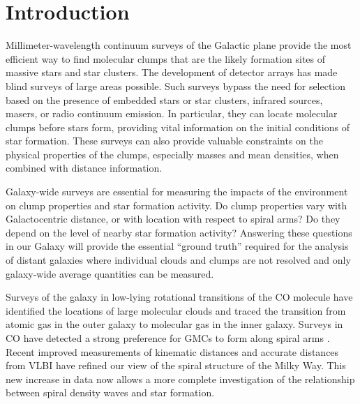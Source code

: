 \documentclass[12pt,preprint]{aastex}
\begin{document}

\section{Introduction}
\label{sec:Introduction}

Millimeter-wavelength continuum surveys of the Galactic plane provide
the most efficient way to find molecular clumps that are the likely
formation sites of massive stars and star clusters. The development of
detector arrays has made blind surveys of large areas possible.  Such
surveys bypass the need for selection based on the presence of
embedded stars or star clusters, infrared sources, masers, or radio
continuum emission. In particular, they can locate molecular clumps
before stars form, providing vital information on the initial
conditions of star formation.  These surveys can also provide valuable
constraints on the physical properties of the clumps, especially
masses and mean densities, when combined with distance information.

Galaxy-wide surveys are essential for measuring the impacts of the
environment on clump properties and star formation activity.  Do clump
properties vary with Galactocentric distance, or with location with
respect to spiral arms?  Do they depend on the level of nearby star
formation activity?  Answering these questions in our Galaxy will
provide the essential ``ground truth'' required for the analysis of
distant galaxies where individual clouds and clumps are not resolved
and only galaxy-wide average quantities can be measured.

Surveys of the galaxy in low-lying rotational transitions of the CO
molecule \citep{dame01,jackson06} have identified the locations of
large molecular clouds and traced the transition from atomic gas in
the outer galaxy to molecular gas in the inner galaxy.  Surveys in CO
have detected a strong preference for GMCs to form along spiral arms
\citep{stark06}.  Recent improved measurements of kinematic distances
\citep[e.g.][]{RotationCurve} and accurate distances from VLBI
\citep{reid09} have refined our view of the spiral structure of the
Milky Way.  This new increase in data now allows a more complete
investigation of the relationship between spiral density waves and
star formation.
\end{document}
